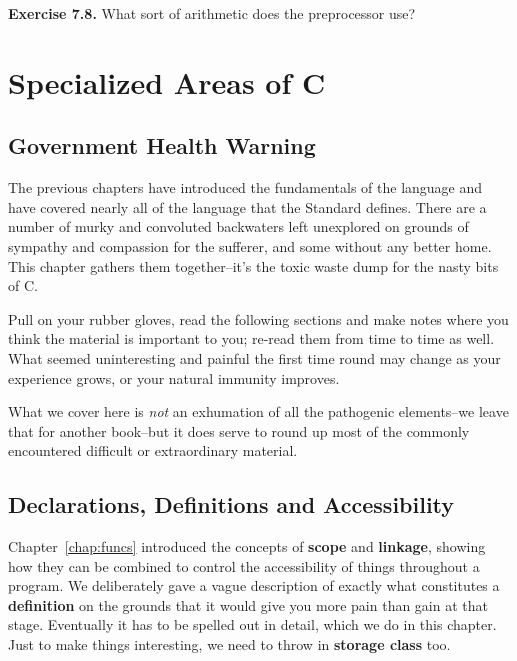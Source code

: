   \textbf{Exercise 7.8.} What sort of arithmetic does the preprocessor
   use?


 \chapter{Specialized Areas of C}\label{chap:special}


        \section{Government Health Warning}
        

  

  The previous chapters have introduced the fundamentals of the language
   and have covered nearly all of the language that the Standard defines.
   There are a number of murky and convoluted backwaters left unexplored on
   grounds of sympathy and compassion for the sufferer, and some without any
   better home. This chapter gathers them together--it's the toxic waste
   dump for the nasty bits of C.


  Pull on your rubber gloves, read the following sections and make notes
   where you think the material is important to you; re-read them from time
   to time as well. What seemed uninteresting and painful the first time
   round may change as your experience grows, or your natural immunity
   improves.


  What we cover here is \textit{not} an exhumation of all the pathogenic
   elements--we leave that for another book--but it does serve to
   round up most of the commonly encountered difficult or extraordinary
   material.


 
        \section{Declarations, Definitions and Accessibility}
        

  

  Chapter~\ref{chap:funcs} introduced the concepts of \textbf{scope} and
   \textbf{linkage}, showing how they can be combined to control the
   accessibility of things throughout a program. We deliberately gave
   a vague description of exactly what constitutes a \textbf{definition}
   on the grounds that it would give you more pain than gain at that stage.
   Eventually it has to be spelled out in detail, which we do in this
   chapter. Just to make things interesting, we need to throw in
   \textbf{storage class} too.


